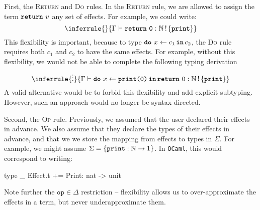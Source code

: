 First, the \textsc{Return} and \textsc{Do} rules. In the \textsc{Return} rule, we are allowed to assign the term $\texttt{\textbf{return}} \,\, {v}$ any set of effects. For example, we could write:
\[\inferrule{ }{\type[]{\return{\texttt{0}}}{\effectType[\{ \textbf{\texttt{print}} \}]{\mathbb{N}}}}\] 
This flexibility is important, because to type $\texttt{\textbf{do}} \,\, {x} \leftarrow {c_1} \, \textbf{\texttt{in}} \, {c_2}$, the \textsc{Do} rule requires both $c_1$ and $c_2$ to have the same effects. For example, without this flexibility, we would not be able to complete the following typing derivation
\[\inferrule{\vdots}{\type[]{\bind{x}{\print{0}}{\return{\texttt{0}}}}{\effectType[\{ \textbf{\texttt{print}} \}]{\mathbb{N}}}}\] 
A valid alternative would be to forbid this flexibility and add explicit subtyping. However, such an approach would no longer be syntax directed. 

Second, the \textsc{Op} rule. Previously, we assumed that the user declared their effects in advance. We also assume that they declare the types of their effects in advance, and that we we store the mapping from effects to types in $\Sigma$. For example, we might assume $\Sigma = \{ \textbf{\texttt{print}}: \mathbb{N} \to 1 \}$. In \texttt{OCaml}, this would correspond to writing:
\begin{ocaml}
type _ Effect.t += Print: nat -> unit
\end{ocaml}
Note further the $\texttt{op} \in \Delta$ restriction -- flexibility allows us to over-approximate the effects in a term, but never underapproximate them. 

